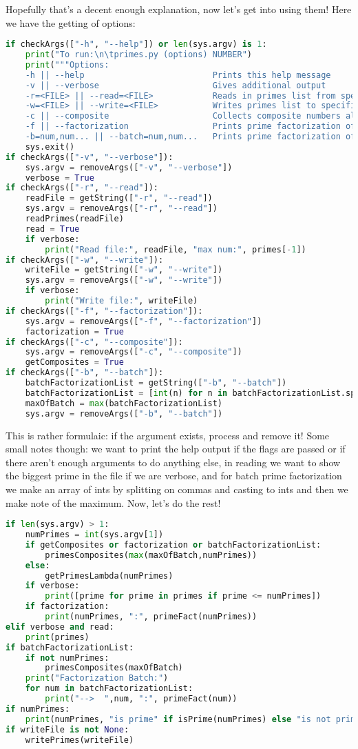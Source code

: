 \documentclass[12pt, twoside, reqno]{book}
\begin{document}
Hopefully that's a decent enough explanation, now let's get into using them! Here we have the getting of options:
\begin{lstlisting}[language=Python]
if checkArgs(["-h", "--help"]) or len(sys.argv) is 1:
    print("To run:\n\tprimes.py (options) NUMBER")
    print("""Options:
    -h || --help                          Prints this help message
    -v || --verbose                       Gives additional output
    -r=<FILE> || --read=<FILE>            Reads in primes list from specified file (JSON)
    -w=<FILE> || --write=<FILE>           Writes primes list to specified file (JSON)
    -c || --composite                     Collects composite numbers also
    -f || --factorization                 Prints prime factorization of NUMBER
    -b=num,num... || --batch=num,num...   Prints prime factorization of num,num,num...""")
    sys.exit()
if checkArgs(["-v", "--verbose"]):
    sys.argv = removeArgs(["-v", "--verbose"])
    verbose = True
if checkArgs(["-r", "--read"]):
    readFile = getString(["-r", "--read"])
    sys.argv = removeArgs(["-r", "--read"])
    readPrimes(readFile)
    read = True
    if verbose:
        print("Read file:", readFile, "max num:", primes[-1])
if checkArgs(["-w", "--write"]):
    writeFile = getString(["-w", "--write"])
    sys.argv = removeArgs(["-w", "--write"])
    if verbose:
        print("Write file:", writeFile)
if checkArgs(["-f", "--factorization"]):
    sys.argv = removeArgs(["-f", "--factorization"])
    factorization = True
if checkArgs(["-c", "--composite"]):
    sys.argv = removeArgs(["-c", "--composite"])
    getComposites = True
if checkArgs(["-b", "--batch"]):
    batchFactorizationList = getString(["-b", "--batch"])
    batchFactorizationList = [int(n) for n in batchFactorizationList.split(",")]
    maxOfBatch = max(batchFactorizationList)
    sys.argv = removeArgs(["-b", "--batch"])
\end{lstlisting}

This is rather formulaic: if the argument exists, process and remove it! Some small notes though: we want to print the help output if the flags are passed or if there aren't enough arguments to do anything else, in reading we want to show the biggest prime in the file if we are verbose, and for batch prime factorization we make an array of ints by splitting on commas and casting to ints and then we make note of the maximum. Now, let's do the rest!
\begin{lstlisting}[language=Python]
if len(sys.argv) > 1:
    numPrimes = int(sys.argv[1])
    if getComposites or factorization or batchFactorizationList:
        primesComposites(max(maxOfBatch,numPrimes))
    else:
        getPrimesLambda(numPrimes)
    if verbose:
        print([prime for prime in primes if prime <= numPrimes])
    if factorization:
        print(numPrimes, ":", primeFact(numPrimes))
elif verbose and read:
    print(primes)
if batchFactorizationList:
    if not numPrimes:
        primesComposites(maxOfBatch)
    print("Factorization Batch:")
    for num in batchFactorizationList:
        print("-->  ",num, ":", primeFact(num))
if numPrimes:
    print(numPrimes, "is prime" if isPrime(numPrimes) else "is not prime")
if writeFile is not None:
    writePrimes(writeFile)
\end{lstlisting}
\end{document}
